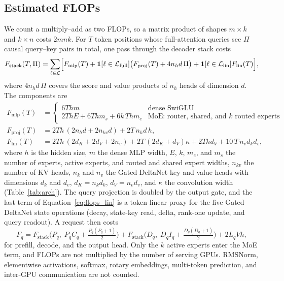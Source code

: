 \documentclass[11pt, copyright, logo, secondlogo]{template/lark}
\begin{document}
\subsection{Estimated FLOPs}
\label{sec:appendix_flops}

We count a multiply--add as two FLOPs, so a matrix product of shapes
$m\times k$ and $k\times n$ costs $2mnk$. For $T$ token positions whose
full-attention queries see $\Pi$ causal query--key pairs in total, one pass
through the decoder stack costs
\begin{equation}
F_{\mathrm{stack}}(T,\Pi)=\sum_{\ell\in\mathcal L}
\Bigl[F_{\mathrm{mlp}}(T)+
\mathbf{1}[\ell\in\mathcal L_{\mathrm{full}}]\bigl(F_{\mathrm{proj}}(T)+4n_hd\,\Pi\bigr)+
\mathbf{1}[\ell\in\mathcal L_{\mathrm{lin}}]F_{\mathrm{lin}}(T)\Bigr],
\label{eq:flops_stack}
\end{equation}
where $4n_hd\,\Pi$ covers the score and value products of $n_h$ heads of
dimension $d$. The components are
\begin{align}
F_{\mathrm{mlp}}(T)&=\begin{cases}
6Thm & \text{dense SwiGLU}\\
2ThE+6Thm_s+6k\,Thm_e & \text{MoE: router, shared, and $k$ routed experts}
\end{cases}\label{eq:flops_mlp}\\
F_{\mathrm{proj}}(T)&=2Th\,(2n_hd+2n_{kv}d)+2T\,n_hd\,h,\label{eq:flops_proj}\\
F_{\mathrm{lin}}(T)&=2Th\,(2d_K+2d_V+2n_v)+2T\,(2d_K+d_V)\kappa+2Thd_V
+10\,T\,n_vd_kd_v,\label{eq:flops_lin}
\end{align}
where $h$ is the hidden size, $m$ the dense MLP width, $E$, $k$, $m_e$, and
$m_s$ the number of experts, active experts, and routed and shared expert
widths, $n_{kv}$ the number of KV heads, $n_k$ and $n_v$ the Gated DeltaNet key
and value heads with dimensions $d_k$ and $d_v$, $d_K=n_kd_k$, $d_V=n_vd_v$, and
$\kappa$ the convolution width (Table~\ref{tab:arch}). The query projection is
doubled by the output gate, and the last term of
Equation~\ref{eq:flops_lin} is a token-linear proxy for the five Gated DeltaNet
state operations (decay, state-key read, delta, rank-one update, and query
readout). A request then costs
\begin{equation}
F_q=F_{\mathrm{stack}}\bigl(P_q,\;P_qC_q+\tfrac{P_q(P_q+1)}{2}\bigr)
+F_{\mathrm{stack}}\bigl(D_q,\;D_qI_q+\tfrac{D_q(D_q+1)}{2}\bigr)
+2L_qVh,
\label{eq:flops_request}
\end{equation}
for prefill, decode, and the output head. Only the $k$ active experts enter
the MoE term, and FLOPs are not multiplied by the number of serving GPUs.
RMSNorm, elementwise activations, softmax, rotary embeddings, multi-token
prediction, and inter-GPU communication are not counted.
\end{document}
